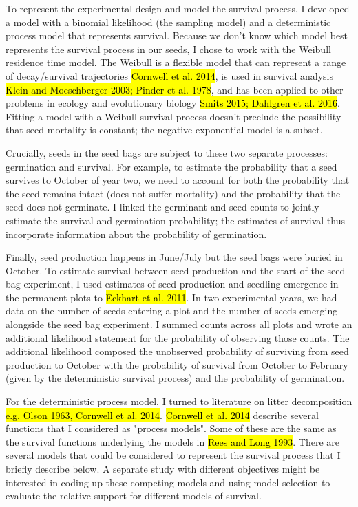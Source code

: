\documentclass[12pt, oneside, titlepage]{article}   	%
\begin{document}
To represent the experimental design and model the survival process, I developed a model with a binomial likelihood (the sampling model) and a deterministic process model that represents survival. Because we don't know which model best represents the survival process in our seeds, I chose to work with the Weibull residence time model. The Weibull is a flexible model that can represent a range of decay/survival trajectories \hl{Cornwell et al. 2014}, is used in survival analysis \hl{Klein and Moeschberger 2003; Pinder et al. 1978}, and has been applied to other problems in ecology and evolutionary biology \hl{Smits 2015; Dahlgren et al. 2016}. Fitting a model with a Weibull survival process doesn't preclude the possibility that seed mortality is constant; the negative exponential model is a subset. 

Crucially, seeds in the seed bags are subject to these two separate processes: germination and survival. For example, to estimate the probability that a seed survives to October of year two, we need to account for both the probability that the seed remains intact (does not suffer mortality) and the probability that the seed does not germinate. I linked the germinant and seed counts to jointly estimate the survival and germination probability; the estimates of survival thus incorporate information about the probability of germination. 

Finally, seed production happens in June/July but the seed bags were buried in October. To estimate survival between seed production and the start of the seed bag experiment, I used estimates of seed production and seedling emergence in the permanent plots to \hl{Eckhart et al. 2011}. In two experimental years, we had data on the number of seeds entering a plot and the number of seeds emerging alongside the seed bag experiment. I summed counts across all plots and wrote an additional likelihood statement for the probability of observing those counts. The additional likelihood composed the unobserved probability of surviving from seed production to October with the probability of survival from October to February (given by the deterministic survival process) and the probability of germination. 

 For the deterministic process model, I turned to literature on litter decomposition \hl{e.g. Olson 1963, Cornwell et al. 2014}. \hl{Cornwell et al. 2014} describe several functions that I considered as "process models". Some of these are the same as the survival functions underlying the models in \hl{Rees and Long 1993}. There are several models that could be considered to represent the survival process that I briefly describe below. A separate study with different objectives might be interested in coding up these competing models and using model selection to evaluate the relative support for different models of survival. 
\end{document}
